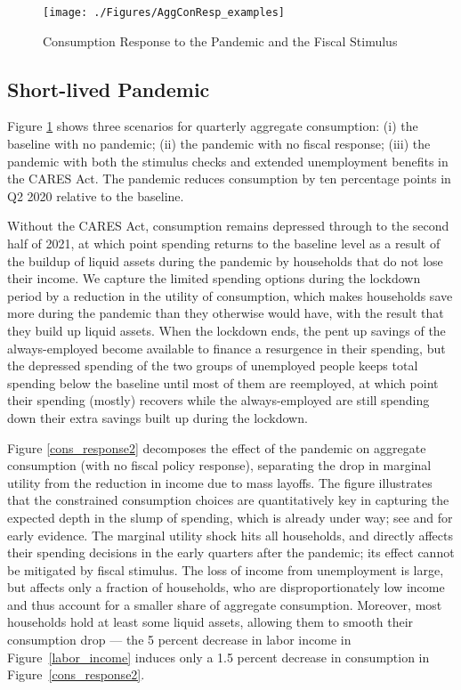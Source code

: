 \documentclass[titlepage,a4paper]{\econtex}
\begin{document}
\begin{figure}
  \centering
  \caption{Consumption Response to the Pandemic and the Fiscal Stimulus}
  \label{cons_response}
  { \texttt{[image: ./Figures/AggConResp\_examples]}}
\end{figure}

\subsection{Short-lived Pandemic}

Figure \ref{cons_response} shows three scenarios for quarterly aggregate consumption: (i) the baseline with no pandemic; (ii) the pandemic with no fiscal response; (iii) the pandemic with both the stimulus checks and extended unemployment benefits in the CARES Act.
The pandemic reduces consumption by ten percentage points in Q2 2020 relative to the baseline.

Without the CARES Act, consumption remains depressed through to the second half of 2021, at which point spending returns to the baseline level as a result of the buildup of liquid assets during the pandemic by households that do not lose their income.
We capture the limited spending options during the lockdown period by a reduction in the utility of consumption, which makes households save more during the pandemic than they otherwise would have, with the result that they build up liquid assets.
When the lockdown ends, the pent up savings of the always-employed become available to finance a resurgence in their spending, but the depressed spending of the two groups of unemployed people keeps total spending below the baseline until most of them are reemployed, at which point their spending (mostly) recovers while the always-employed are still spending down their extra savings built up during the lockdown.

Figure \ref{cons_response2} decomposes the effect of the pandemic on aggregate consumption (with no fiscal policy response), separating the drop in marginal utility from the reduction in income due to mass layoffs.
The figure illustrates that the constrained consumption choices are quantitatively key in capturing the expected depth in the slump of spending, which is already under way; see \cite{baker_Cpandemic} and \cite{nyFedCoronaBlog} for early evidence.
The marginal utility shock hits all households, and directly affects their spending decisions in the early quarters after the pandemic; its effect cannot be mitigated by fiscal stimulus.
The loss of income from unemployment is large, but affects only a fraction of households, who are disproportionately low income and thus account for a smaller share of aggregate consumption.
Moreover, most households hold at least some liquid assets, allowing them to smooth their consumption drop --- the 5 percent  decrease in labor income in Figure~\ref{labor_income} induces only a 1.5 percent decrease in consumption in Figure~\ref{cons_response2}.
\end{document}
